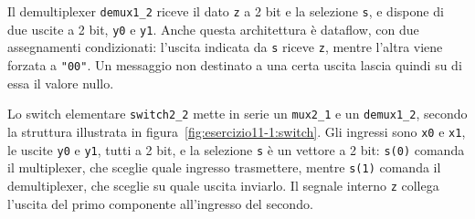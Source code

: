 
Il demultiplexer \texttt{demux1\_2} riceve il dato \texttt{z} a 2 bit e la selezione \texttt{s}, e dispone di due uscite a 2 bit, \texttt{y0} e \texttt{y1}. Anche questa architettura è dataflow, con due assegnamenti condizionati: l'uscita indicata da \texttt{s} riceve \texttt{z}, mentre l'altra viene forzata a \texttt{"00"}. Un messaggio non destinato a una certa uscita lascia quindi su di essa il valore nullo.


Lo switch elementare \texttt{switch2\_2} mette in serie un \texttt{mux2\_1} e un \texttt{demux1\_2}, secondo la struttura illustrata in figura~\ref{fig:esercizio11-1:switch}. Gli ingressi sono \texttt{x0} e \texttt{x1}, le uscite \texttt{y0} e \texttt{y1}, tutti a 2 bit, e la selezione \texttt{s} è un vettore a 2 bit: \texttt{s(0)} comanda il multiplexer, che sceglie quale ingresso trasmettere, mentre \texttt{s(1)} comanda il demultiplexer, che sceglie su quale uscita inviarlo. Il segnale interno \texttt{z} collega l'uscita del primo componente all'ingresso del secondo.

